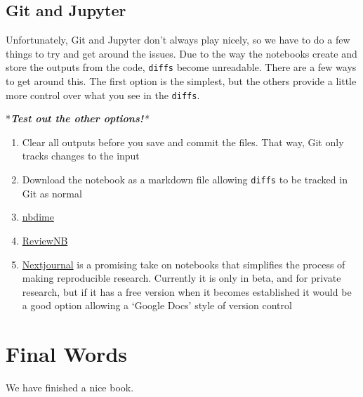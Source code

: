 \documentclass[]{book}
\providecommand{\tightlist}{%
  \setlength{\itemsep}{0pt}\setlength{\parskip}{0pt}}
\begin{document}
\hypertarget{git-and-jupyter}{%
\section{Git and Jupyter}\label{git-and-jupyter}}

Unfortunately, Git and Jupyter don't always play nicely, so we have to do a few things to try and get around the issues. Due to the way the notebooks create and store the outputs from the code, \texttt{diffs} become unreadable. There are a few ways to get around this. The first option is the simplest, but the others provide a little more control over what you see in the \texttt{diffs}.

*\emph{\textbf{Test out the other options!}*}

\begin{enumerate}
\def\labelenumi{\arabic{enumi}.}
\tightlist
\item
  Clear all outputs before you save and commit the files. That way, Git only tracks changes to the input
\item
  Download the notebook as a markdown file allowing \texttt{diffs} to be tracked in Git as normal
\item
  \href{https://nbdime.readthedocs.io/en/latest/index.html}{nbdime}
\item
  \href{https://www.reviewnb.com/}{ReviewNB}
\item
  \href{https://nextjournal.com/}{Nextjournal} is a promising take on notebooks that simplifies the process of making reproducible research. Currently it is only in beta, and for private research, but if it has a free version when it becomes established it would be a good option allowing a `Google Docs' style of version control
\end{enumerate}

\hypertarget{final-words}{%
\chapter{Final Words}\label{final-words}}

We have finished a nice book.


\end{document}
